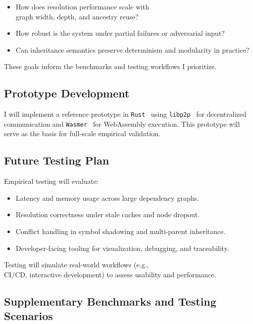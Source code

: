 \documentclass[sigplan,screen]{acmart}
\begin{document}
\begin{itemize}
	\item How does resolution performance scale with \\graph width, depth, and ancestry reuse?
	\item How robust is the system under partial failures or adversarial input?
	\item Can inheritance semantics preserve determinism and modularity in practice?
\end{itemize}

These goals inform the benchmarks and testing workflows I prioritize.

\subsection{Prototype Development}

I will implement a reference prototype in \texttt{Rust}~\cite{rust} using \texttt{libp2p}~\cite{libp2p} for decentralized communication and \texttt{Wasmer}~\cite{wasmer} for WebAssembly execution. This prototype will serve as the basis for full-scale empirical validation.

\subsection{Future Testing Plan}

Empirical testing will evaluate:

\begin{itemize}
	\item Latency and memory usage across large dependency graphs.
	\item Resolution correctness under stale caches and node dropout.
	\item Conflict handling in symbol shadowing and multi-parent inheritance.
	\item Developer-facing tooling for visualization, debugging, and traceability.
\end{itemize}

Testing will simulate real-world workflows (e.g., \\CI/CD, interactive development) to assess usability and performance.

\subsection{Supplementary Benchmarks and Testing Scenarios}
\label{sec:supplementary-benchmarks}
\end{document}
